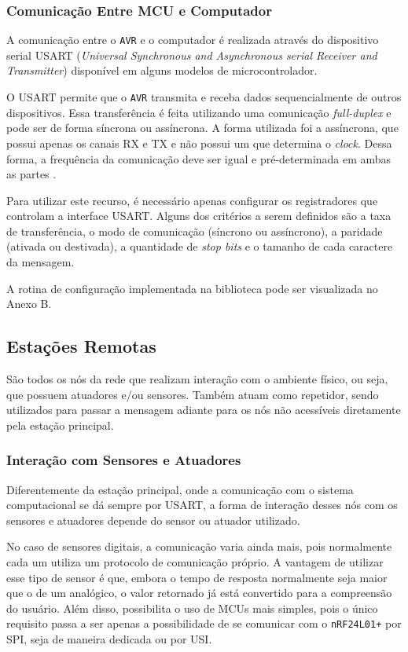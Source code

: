 \subsubsection{Comunicação Entre MCU e Computador}
A comunicação entre o \texttt{AVR} e o computador é realizada através do dispositivo serial USART
(\textit{Universal Synchronous and Asynchronous serial Receiver and Transmitter}) disponível em alguns modelos
de microcontrolador.

O USART permite que o \texttt{AVR} transmita e receba dados sequencialmente de outros dispositivos. Essa
transferência é feita utilizando uma comunicação \textit{full-duplex} e pode ser de forma síncrona ou
assíncrona. A forma utilizada foi a assíncrona, que possui apenas os canais RX e TX e não possui um que
determina o \textit{clock}. Dessa forma, a frequência da comunicação deve ser igual e pré-determinada em ambas
as partes \cite{williams2014}.

Para utilizar este recurso, é necessário apenas configurar os registradores que controlam a interface USART.
Alguns dos critérios a serem definidos são a taxa de transferência, o modo de comunicação (síncrono ou
assíncrono), a paridade (ativada ou destivada), a quantidade de \textit{stop bits} e o tamanho de cada
caractere da mensagem.

A rotina de configuração implementada na biblioteca pode ser visualizada no Anexo B.

\subsection{Estações Remotas}
São todos os nós da rede que realizam interação com o ambiente físico, ou seja, que possuem atuadores e/ou
sensores. Também atuam como repetidor, sendo utilizados para passar a mensagem adiante para os nós não acessíveis
diretamente pela estação principal.

\subsubsection{Interação com Sensores e Atuadores}
Diferentemente da estação principal, onde a comunicação com o sistema computacional se dá sempre por USART, a
forma de interação desses nós com os sensores e atuadores depende do sensor ou atuador utilizado.

No caso de sensores digitais, a comunicação varia ainda mais, pois normalmente cada um utiliza um protocolo de
comunicação próprio. A vantagem de utilizar esse tipo de sensor é que, embora o tempo de resposta normalmente
seja maior que o de um analógico, o valor retornado já está convertido para a compreensão do usuário. Além
disso, possibilita o uso de MCUs mais simples, pois o único requisito passa a ser apenas a possibilidade de se
comunicar com o \texttt{nRF24L01+} por SPI, seja de maneira dedicada ou por USI.

